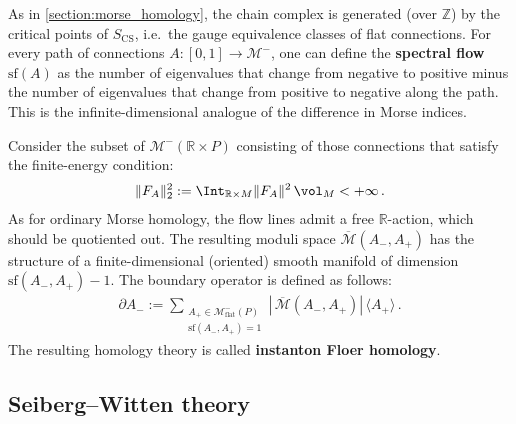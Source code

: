     As in \cref{section:morse_homology}, the chain complex is generated (over $\mathbb{Z}$) by the critical points of $S_{\text{CS}}$, i.e.~the gauge equivalence classes of flat connections. For every path of connections $A:[0,1]\rightarrow\mathcal{M}^-$, one can define the \textbf{spectral flow} $\mathrm{sf}(A)$ as the number of eigenvalues that change from negative to positive minus the number of eigenvalues that change from positive to negative along the path. This is the infinite-dimensional analogue of the difference in Morse indices.

    Consider the subset of $\mathcal{M}^-(\mathbb{R}\times P)$ consisting of those connections that satisfy the finite-energy condition:
    \begin{gather}
        \|F_A\|^2_2 := \Int_{\mathbb{R}\times M}\|F_A\|^2\,\vol_M<+\infty\,.
    \end{gather}
    As for ordinary Morse homology, the flow lines admit a free $\mathbb{R}$-action, which should be quotiented out. The resulting moduli space $\overline{\mathcal{M}}(A_-,A_+)$ has the structure of a finite-dimensional (oriented) smooth manifold of dimension $\mathrm{sf}(A_-,A_+)-1$. The boundary operator is defined as follows:
    \begin{gather}
        \partial A_- := \sum_{\substack{A_+\in\mathcal{M}^-_{\text{flat}}(P)\\\mathrm{sf}(A_-,A_+)=1}}\left|\,\overline{\mathcal{M}}(A_-,A_+)\right|\,\langle A_+ \rangle\,.
    \end{gather}
    The resulting homology theory is called \textbf{instanton Floer homology}.

\subsection{Seiberg--Witten theory}

